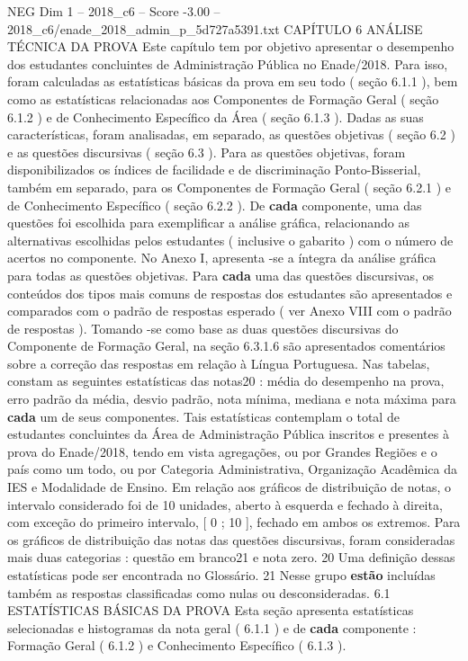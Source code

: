 \begin{textsample}{NEG Dim 1 – 2018\_c6 – Score -3.00 – 2018\_c6/enade\_2018\_admin\_p\_5d727a5391.txt}  \label{ex:f1_neg_196}
CAPÍTULO 6 ANÁLISE TÉCNICA DA PROVA Este capítulo tem por objetivo apresentar o desempenho dos estudantes concluintes de Administração Pública no Enade/2018.
Para isso, foram calculadas as estatísticas básicas da prova em seu todo ( seção 6.1.1 ), bem como as estatísticas relacionadas aos Componentes de Formação Geral ( seção 6.1.2 ) e de Conhecimento Específico da Área ( seção 6.1.3 ).
Dadas as suas características, foram analisadas, em separado, as questões objetivas ( seção 6.2 ) e as questões discursivas ( seção 6.3 ).
Para as questões objetivas, foram disponibilizados os índices de facilidade e de discriminação Ponto-Bisserial, também em separado, para os Componentes de Formação Geral ( seção 6.2.1 ) e de Conhecimento Específico ( seção 6.2.2 ).
De \textbf{cada} componente, uma das questões foi escolhida para exemplificar a análise gráfica, relacionando as alternativas escolhidas pelos estudantes ( inclusive o gabarito ) com o número de acertos no componente.
No Anexo I, apresenta -se a íntegra da análise gráfica para todas as questões objetivas.
Para \textbf{cada} uma das questões discursivas, os conteúdos dos tipos mais comuns de respostas dos estudantes são apresentados e comparados com o padrão de respostas esperado ( ver Anexo VIII com o padrão de respostas ).
Tomando -se como base as duas questões discursivas do Componente de Formação Geral, na seção 6.3.1.6 são apresentados comentários sobre a correção das respostas em relação à Língua Portuguesa.
Nas tabelas, constam as seguintes estatísticas das notas20 : média do desempenho na prova, erro padrão da média, desvio padrão, nota mínima, mediana e nota máxima para \textbf{cada} um de seus componentes.
Tais estatísticas contemplam o total de estudantes concluintes da Área de Administração Pública inscritos e presentes à prova do Enade/2018, tendo em vista agregações, ou por Grandes Regiões e o país como um todo, ou por Categoria Administrativa, Organização Acadêmica da IES e Modalidade de Ensino.
Em relação aos gráficos de distribuição de notas, o intervalo considerado foi de 10 unidades, aberto à esquerda e fechado à direita, com exceção do primeiro intervalo, [ 0 ; 10 ], fechado em ambos os extremos.
Para os gráficos de distribuição das notas das questões discursivas, foram consideradas mais duas categorias : questão em branco21 e nota zero. 20 Uma definição dessas estatísticas pode ser encontrada no Glossário. 21 Nesse grupo \textbf{estão} incluídas também as respostas classificadas como nulas ou desconsideradas. 6.1 ESTATÍSTICAS BÁSICAS DA PROVA Esta seção apresenta estatísticas selecionadas e histogramas da nota geral ( 6.1.1 ) e de \textbf{cada} componente : Formação Geral ( 6.1.2 ) e Conhecimento Específico ( 6.1.3 ).

\end{textsample}
